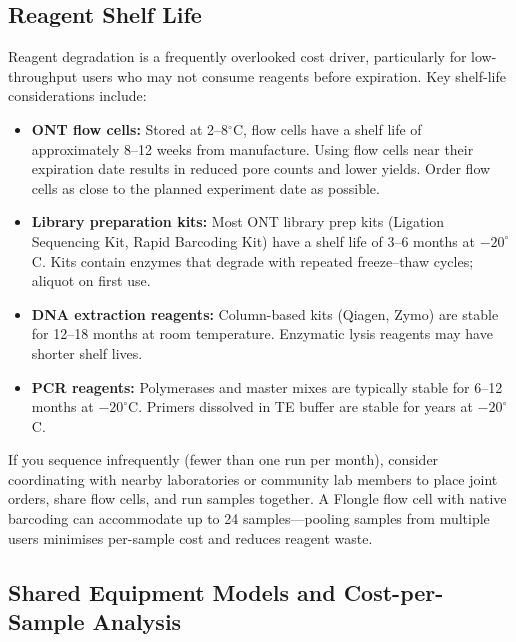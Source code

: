 \subsection{Reagent Shelf Life}
\label{subsec:accessible:shelflife}

Reagent degradation is a frequently overlooked cost driver, particularly for low-throughput users who may not consume reagents before expiration. Key shelf-life considerations include:

\begin{itemize}[itemsep=2pt]
  \item \textbf{\acrshort{ONT} flow cells:} Stored at 2--8$^{\circ}$C, flow cells have a shelf life of approximately 8--12 weeks from manufacture. Using flow cells near their expiration date results in reduced pore counts and lower yields. Order flow cells as close to the planned experiment date as possible.
  \item \textbf{Library preparation kits:} Most \acrshort{ONT} library prep kits (Ligation Sequencing Kit, Rapid Barcoding Kit) have a shelf life of 3--6 months at $-20^{\circ}$C. Kits contain enzymes that degrade with repeated freeze--thaw cycles; aliquot on first use.
  \item \textbf{DNA extraction reagents:} Column-based kits (Qiagen, Zymo) are stable for 12--18 months at room temperature. Enzymatic lysis reagents may have shorter shelf lives.
  \item \textbf{\acrshort{PCR} reagents:} Polymerases and master mixes are typically stable for 6--12 months at $-20^{\circ}$C. Primers dissolved in TE buffer are stable for years at $-20^{\circ}$C.
\end{itemize}

\begin{tipbox}[title={Group Purchasing for Low-Throughput Users}]
If you sequence infrequently (fewer than one run per month), consider coordinating with nearby laboratories or community lab members to place joint orders, share flow cells, and run samples together. A Flongle flow cell with native barcoding can accommodate up to 24 samples---pooling samples from multiple users minimises per-sample cost and reduces reagent waste.
\end{tipbox}

\subsection{Shared Equipment Models and Cost-per-Sample Analysis}
\label{subsec:accessible:shared}


